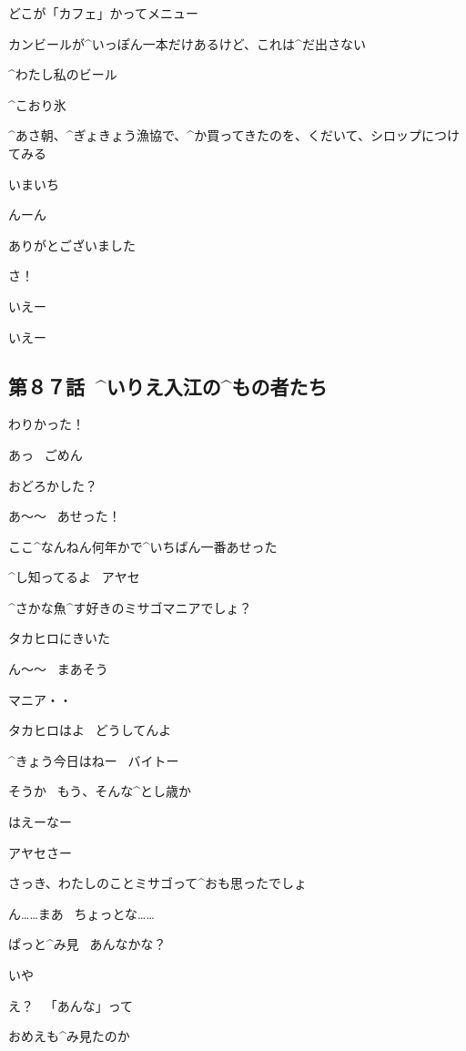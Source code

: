 \Alpha どこが「カフェ」かってメニュー

\Alpha カンビールが^{いっぽん}{一本}だけあるけど、これは^{だ}{出}さない

\Alpha ^{わたし}{私}のビール

\page[134]
\Alpha ^{こおり}{氷}

\Alpha ^{あさ}{朝}、^{ぎょきょう}{漁協}で、^{か}{買}ってきたのを、くだいて、シロップにつけてみる

\Alpha いまいち

\Alpha んーん

\page[135]
\Alpha ありがとございました

\Alpha さ！

\page[136]
\Alpha いえー

\Ojisan いえー


\subsection{第８７話\ ^{いりえ}{入江}の^{もの}{者}たち}

\page[141]
\Ayase わりかった！

\page[144]
\Makki あっ
\ ごめん

\Makki おどろかした？

\page[145]
\Ayase あ〜〜
\ あせった！

\Ayase ここ^{なんねん}{何年}かで^{いちばん}{一番}あせった

\Makki ^{し}{知}ってるよ
\ アヤセ

\Makki ^{さかな}{魚}^{す}{好}きのミサゴマニアでしょ？

\Makki タカヒロにきいた

\Ayase ん〜〜
\ まあそう

\Ayase マニア・・

\page[146]
\Ayase タカヒロはよ
\ どうしてんよ

\Makki ^{きょう}{今日}はねー
\ バイトー

\Ayase そうか
\ もう、そんな^{とし}{歳}か

\Ayase はえーなー

\Makki アヤセさー

\Makki さっき、わたしのことミサゴって^{おも}{思}ったでしょ

\Ayase ん……まあ
\ ちょっとな……

\page[147]
\Makki ぱっと^{み}{見}
\ あんなかな？

\Ayase いや

\Ayase え？
\ 「あんな」って

\Ayase おめえも^{み}{見}たのか

